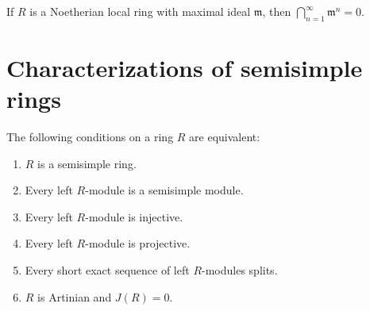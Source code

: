 \begin{corollary}
    If $R$ is a Noetherian local ring with maximal ideal $\mathfrak{m}$, then $\bigcap_{n=1}^{\infty} \mathfrak{m}^n=0$.
\end{corollary}






\section{Characterizations of semisimple rings}
\begin{theorem}
    The following conditions on a ring $R$ are equivalent:
    \begin{enumerate}
        \item
              $R$ is a semisimple ring.
        \item
              Every left $R$-module is a semisimple module.
        \item
              Every left $R$-module is injective.
        \item
              Every left $R$-module is projective.
        \item
              Every short exact sequence of left $R$-modules splits.
        \item
              $R$ is Artinian and $J(R)=0$.
    \end{enumerate}
\end{theorem}
















